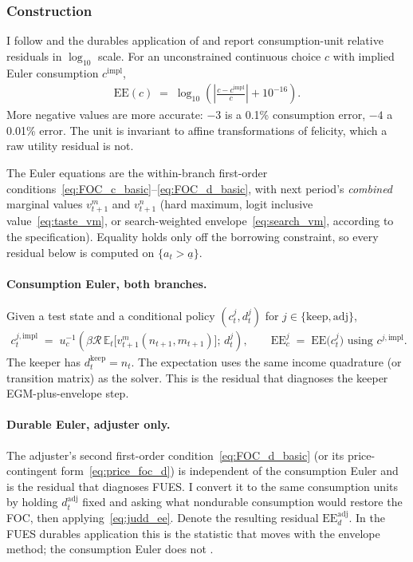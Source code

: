 \subsubsection{Construction}

I follow \citet{Judd1992-sp} and the durables application of \citet{Dobrescu2022-ii} and report consumption-unit relative residuals in $\log_{10}$ scale. For an unconstrained continuous choice $c$ with implied Euler consumption $c^{\mathrm{impl}}$,
\begin{align}
	\mathrm{EE}(c)
	\;=\;
	\log_{10}\!\left(
		\left\lvert \frac{c - c^{\mathrm{impl}}}{c} \right\rvert
		+ 10^{-16}
	\right).
	\label{eq:judd_ee}
\end{align}
More negative values are more accurate: $-3$ is a 0.1\% consumption error, $-4$ a 0.01\% error. The unit is invariant to affine transformations of felicity, which a raw utility residual is not.

The Euler equations are the within-branch first-order conditions~\eqref{eq:FOC_c_basic}--\eqref{eq:FOC_d_basic}, with next period's \emph{combined} marginal values $v_{t+1}^{m}$ and $v_{t+1}^{n}$ (hard maximum, logit inclusive value~\eqref{eq:taste_vm}, or search-weighted envelope~\eqref{eq:search_vm}, according to the specification). Equality holds only off the borrowing constraint, so every residual below is computed on $\{a_t>\underline{a}\}$.

\paragraph{Consumption Euler, both branches.}
Given a test state and a conditional policy $(c_t^{j},d_t^{j})$ for $j\in\{\mathrm{keep},\mathrm{adj}\}$,
\begin{align}
	c_t^{j,\mathrm{impl}}
	\;=\;
	u_c^{-1}\!\left(
		\beta\mathcal{R}\,\mathbb{E}_t\bigl[v_{t+1}^{m}(n_{t+1},m_{t+1})\bigr]
		;\,
		d_t^{j}
	\right),
	\qquad
	\mathrm{EE}_c^{j}
	\;=\;
	\mathrm{EE}\bigl(c_t^{j}\bigr)
	\text{ using }c^{j,\mathrm{impl}}.
	\label{eq:ee_c}
\end{align}
The keeper has $d_t^{\mathrm{keep}}=n_t$. The expectation uses the same income quadrature (or transition matrix) as the solver. This is the residual that diagnoses the keeper EGM-plus-envelope step.

\paragraph{Durable Euler, adjuster only.}
The adjuster's second first-order condition~\eqref{eq:FOC_d_basic} (or its price-contingent form~\eqref{eq:price_foc_d}) is independent of the consumption Euler and is the residual that diagnoses FUES. I convert it to the same consumption units by holding $d_t^{\mathrm{adj}}$ fixed and asking what nondurable consumption would restore the FOC, then applying~\eqref{eq:judd_ee}. Denote the resulting residual $\mathrm{EE}_d^{\mathrm{adj}}$. In the FUES durables application this is the statistic that moves with the envelope method; the consumption Euler does not \citep{Dobrescu2022-ii}.

